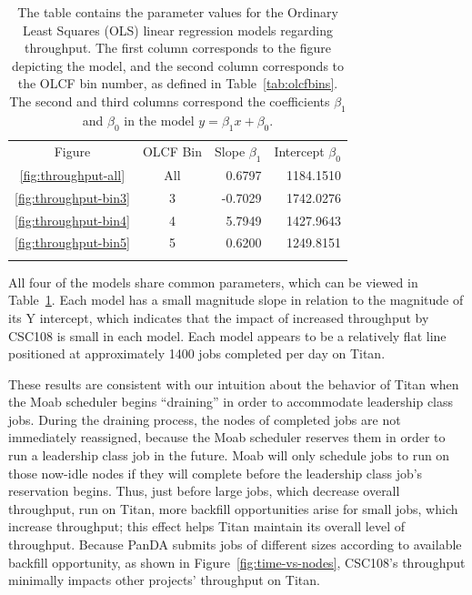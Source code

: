 \begin{table}
\caption{The table contains the parameter values for the Ordinary Least Squares
(OLS) linear regression models regarding throughput. The first column 
corresponds to the figure depicting the model, and the second column
corresponds to the OLCF bin number, as defined in Table~\ref{tab:olcfbins}. The
second and third columns correspond the coefficients $\beta_1$ and $\beta_0$ in
the model $y = \beta_{1}x + \beta_0$.}
\label{tab:throughput-params}       %
\begin{tabular}{ccrr}
\hline\noalign{\smallskip}
Figure & OLCF Bin & Slope $\beta_1$  & Intercept $\beta_0$  \\
\noalign{\smallskip}\hline\noalign{\smallskip}
\ref{fig:throughput-all}    &   All &   0.6797  &   1184.1510   \\
\ref{fig:throughput-bin3}   &   3   &  -0.7029  &   1742.0276   \\
\ref{fig:throughput-bin4}   &   4   &   5.7949  &   1427.9643   \\
\ref{fig:throughput-bin5}   &   5   &   0.6200  &   1249.8151   \\
\noalign{\smallskip}\hline
\end{tabular}
\end{table}

All four of the models share common parameters, which can be viewed in
Table~\ref{tab:throughput-params}. Each model has a small magnitude slope in
relation to the magnitude of its Y intercept, which indicates that the impact
of increased throughput by CSC108 is small in each model. Each model appears to
be a relatively flat line positioned at approximately 1400 jobs completed per
day on Titan.

These results are consistent with our intuition about the behavior of Titan
when the Moab scheduler begins ``draining'' in order to accommodate leadership
class jobs. During the draining process, the nodes of completed jobs are not
immediately reassigned, because the Moab scheduler reserves them in order to
run a leadership class job in the future. Moab will only schedule jobs to run
on those now-idle nodes if they will complete before the leadership class job's
reservation begins. Thus, just before large jobs, which decrease overall
throughput, run on Titan, more backfill opportunities arise for small jobs,
which increase throughput; this effect helps Titan maintain its overall level
of throughput. Because PanDA submits jobs of different sizes according to
available backfill opportunity, as shown in Figure~\ref{fig:time-vs-nodes},
CSC108's throughput minimally impacts other projects' throughput on Titan.


